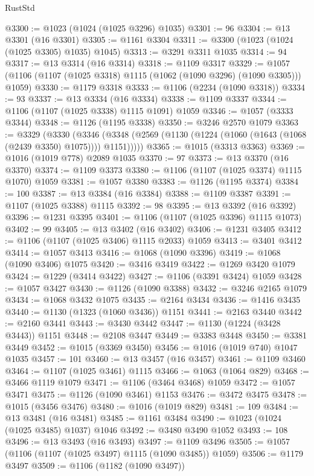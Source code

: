 \begin{lexlean}{RustStd}
\begin{coremodule}
{\begin{coremodule}
{{{{{{{{{{{{{{{{{{{{{{{{{{{{{{{{{{{@3300 := @1023 (@1024 (@1025 @3296) @1035)
@3301 := 96
@3304 := @13 @3301 (@16 @3301)
@3305 := @1161 @3304
@3311 := @3300 (@1023 (@1024 (@1025 @3305) @1035) @1045)
@3313 := @3291 @3311 @1035
@3314 := 94
@3317 := @13 @3314 (@16 @3314)
@3318 := @1109 @3317
@3329 := @1057 (@1106 (@1107 (@1025 @3318) @1115 (@1062 (@1090 @3296) (@1090 @3305))) @1059)
@3330 := @1179 @3318
@3333 := @1106 (@2234 (@1090 @3318))
@3334 := 93
@3337 := @13 @3334 (@16 @3334)
@3338 := @1109 @3337
@3344 := @1106 (@1107 (@1025 @3338) @1115 @1091) @1059
@3346 := @1057 (@3333 @3344)
@3348 := @1126 (@1195 @3338)
@3350 := @3246 @2570 @1079
@3363 := @3329
    (@3330
      (@3346 (@3348 (@2569 (@1130 (@1224 (@1060 (@1643 (@1068 (@2439 @3350) @1075)))) @1151)))))
@3365 := @1015 (@3313 @3363)
@3369 := @1016 (@1019 @778) @2089 @1035
@3370 := 97
@3373 := @13 @3370 (@16 @3370)
@3374 := @1109 @3373
@3380 := @1106 (@1107 (@1025 @3374) @1115 @1070) @1059
@3381 := @1057 @3380
@3383 := @1126 (@1195 @3374)
@3384 := 100
@3387 := @13 @3384 (@16 @3384)
@3388 := @1109 @3387
@3391 := @1107 (@1025 @3388) @1115
@3392 := 98
@3395 := @13 @3392 (@16 @3392)
@3396 := @1231 @3395
@3401 := @1106 (@1107 (@1025 @3396) @1115 @1073)
@3402 := 99
@3405 := @13 @3402 (@16 @3402)
@3406 := @1231 @3405
@3412 := @1106 (@1107 (@1025 @3406) @1115 @2033) @1059
@3413 := @3401 @3412
@3414 := @1057 @3413
@3416 := @1068 (@1090 @3396)
@3419 := @1068 (@1090 @3406) @1075
@3420 := @3416 @3419
@3422 := @1269 @3420 @1079
@3424 := @1229 (@3414 @3422)
@3427 := @1106 (@3391 @3424) @1059
@3428 := @1057 @3427
@3430 := @1126 (@1090 @3388)
@3432 := @3246 @2165 @1079
@3434 := @1068 @3432 @1075
@3435 := @2164 @3434
@3436 := @1416 @3435
@3440 := @1130 (@1323 (@1060 @3436)) @1151
@3441 := @2163 @3440
@3442 := @2160 @3441
@3443 := @3430 @3442
@3447 := @1130 (@1224 (@3428 @3443)) @1151
@3448 := @2108 @3447
@3449 := @3383 @3448
@3450 := @3381 @3449
@3452 := @1015 (@3369 @3450)
@3456 := @1016 (@1019 @740) @1047 @1035
@3457 := 101
@3460 := @13 @3457 (@16 @3457)
@3461 := @1109 @3460
@3464 := @1107 (@1025 @3461) @1115
@3466 := @1063 (@1064 @829)
@3468 := @3466 @1119 @1079
@3471 := @1106 (@3464 @3468) @1059
@3472 := @1057 @3471
@3475 := @1126 (@1090 @3461) @1153
@3476 := @3472 @3475
@3478 := @1015 (@3456 @3476)
@3480 := @1016 (@1019 @829)
@3481 := 109
@3484 := @13 @3481 (@16 @3481)
@3485 := @1161 @3484
@3490 := @1023 (@1024 (@1025 @3485) @1037) @1046
@3492 := @3480 @3490 @1052
@3493 := 108
@3496 := @13 @3493 (@16 @3493)
@3497 := @1109 @3496
@3505 := @1057 (@1106 (@1107 (@1025 @3497) @1115 (@1090 @3485)) @1059)
@3506 := @1179 @3497
@3509 := @1106 (@1182 (@1090 @3497))
}}}}}}}}}}}}}}}}}}}}}}}}}}}}}}}}}}}
\end{coremodule}}
\end{coremodule}
\end{lexlean}
